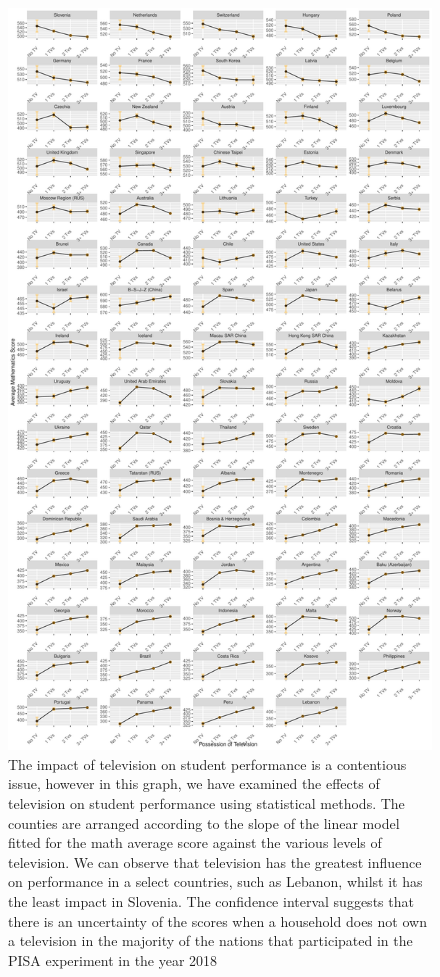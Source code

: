\begin{Schunk}
\begin{figure}[H]
\includegraphics[width=1\linewidth]{learningtower_files/figure-latex/tv-plot-1} \caption[The impact of television on student performance is a contentious issue, however in this graph, we have examined the effects of television on student performance using statistical methods]{The impact of television on student performance is a contentious issue, however in this graph, we have examined the effects of television on student performance using statistical methods. The counties are arranged according to the slope of the linear model fitted for the math average score against the various levels of television. We can observe that television has the greatest influence on performance in a select countries, such as Lebanon, whilst it has the least impact in Slovenia. The confidence interval suggests that there is an uncertainty of the scores when a household does not own a television in the majority of the nations that participated in the PISA experiment in the year 2018}\label{fig:tv-plot}
\end{figure}
\end{Schunk}

